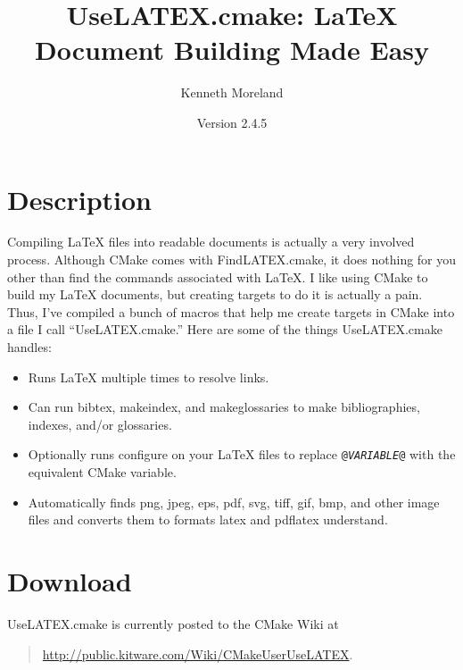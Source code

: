\documentclass{article}
\newcommand{\UseLATEXVersion}{2.4.5}
\newcommand*{\textfile}[1]{\textsf{#1}}
\newcommand*{\textprog}[1]{\textfile{#1}}
\newcommand*{\textcmake}[1]{\texttt{#1}}
\newcommand*{\textvar}[1]{\textit{#1}}
\newcommand*{\UseLATEX}{\textfile{UseLATEX.cmake}\xspace}
\newcommand*{\latex}{\LaTeX\xspace}
\begin{document}
  \sloppy

  \title{UseLATEX.cmake: \latex Document Building Made Easy}
  \author{Kenneth Moreland}
  \date{Version \UseLATEXVersion}
  \maketitle

  \tableofcontents


  \section{Description}
  \label{sec:Description}

  Compiling \latex files into readable documents is actually a very
  involved process. Although CMake comes with \textfile{FindLATEX.cmake},
  it does nothing for you other than find the commands associated with
  \latex. I like using CMake to build my \latex documents, but creating
  targets to do it is actually a pain. Thus, I've compiled a bunch of
  macros that help me create targets in CMake into a file I call
  ``\UseLATEX.'' Here are some of the things \UseLATEX handles:

  \begin{itemize}
  \item Runs \latex multiple times to resolve links.
  \item Can run \textprog{bibtex}, \textprog{makeindex}, and
    \textprog{makeglossaries} to make bibliographies, indexes, and/or
    glossaries.
  \item Optionally runs configure on your \latex files to replace
    \textcmake{@\textvar{VARIABLE}@} with the equivalent CMake variable.
  \item Automatically finds png, jpeg, eps, pdf, svg, tiff, gif, bmp, and
    other image files and converts them to formats \textprog{latex} and
    \textprog{pdflatex} understand.
  \end{itemize}


  \section{Download}
  \label{sec:Download}

  \UseLATEX is currently posted to the CMake Wiki at
  \begin{quote}
    \href{http://public.kitware.com/Wiki/CMakeUserUseLATEX}{http://public.kitware.com/Wiki/CMakeUserUseLATEX}.
  \end{quote}
\end{document}

